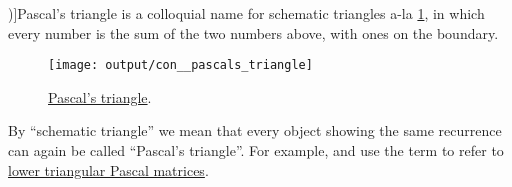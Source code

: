 \begin{concept}\label{con:pascals_triangle}
  \term[ru=треугольник Паскаля (\cite[\S 5.3.4]{Новиков2013ДискретнаяМатематика})]{Pascal's triangle} is a colloquial name for schematic triangles a-la \cref{fig:con:pascals_triangle}, in which every number is the sum of the two numbers above, with ones on the boundary.

  \begin{figure}[!ht]
    \centering
    \texttt{[image: output/con\_\_pascals\_triangle]}
    \caption{\hyperref[con:pascals_triangle]{Pascal's triangle}.}\label{fig:con:pascals_triangle}
  \end{figure}

  By \enquote{schematic triangle} we mean that every object showing the same recurrence can again be called \enquote{Pascal's triangle}. For example,  and  use the term to refer to \hyperref[def:pascal_matrix/lower]{lower triangular Pascal matrices}.
\end{concept}

